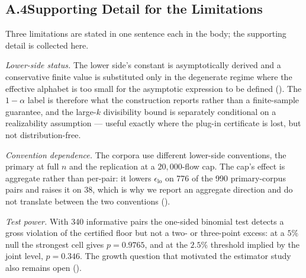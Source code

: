 \documentclass[letterpaper,twocolumn,10pt]{article}
\newcommand{\epslo}{\ensuremath{\epsilon_{\mathrm{lo}}}}
\begin{document}
\subsection*{A.4\quad Supporting Detail for the Limitations}
\label{sec:appendix/limitations}

Three limitations are stated in one sentence each in the body; the supporting
detail is collected here.

\emph{Lower-side status.} The lower side's constant is asymptotically derived
and a conservative finite value is substituted only in the degenerate regime
where the effective alphabet is too small for the asymptotic expression to be
defined (). The $1-\alpha$ label is therefore what the
construction reports rather than a finite-sample guarantee, and the large-$k$
divisibility bound is separately conditional on a realizability assumption ---
useful exactly where the plug-in certificate is lost, but not distribution-free.

\emph{Convention dependence.} The corpora use different lower-side conventions,
the primary at full $n$ and the replication at a $20{,}000$-flow cap. The cap's
effect is aggregate rather than per-pair: it lowers $\epslo$ on 776 of the 990
primary-corpus pairs and raises it on 38, which is why we report an aggregate
direction and do not translate between the two conventions
().

\emph{Test power.} With 340 informative pairs the one-sided binomial test
detects a gross violation of the certified floor but not a two- or three-point
excess: at a $5\%$ null the strongest cell gives $p = 0.9765$, and at the
$2.5\%$ threshold implied by the joint level, $p = 0.346$. The growth question
that motivated the estimator study also remains open
().



\end{document}
